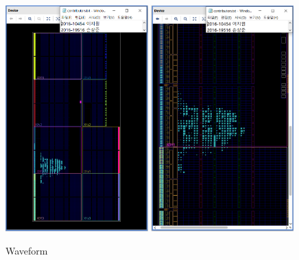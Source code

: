 \documentclass{article}
\begin{document}
\begin{figure}[ht]
	\centering
	\includegraphics[width=0.49\textwidth]{fig/My_PE_Controller_Design1.png}
	\includegraphics[width=0.49\textwidth]{fig/My_PE_Controller_Design2.png}
\caption{Waveform}
\label{fig3}
\end{figure}
\end{document}
